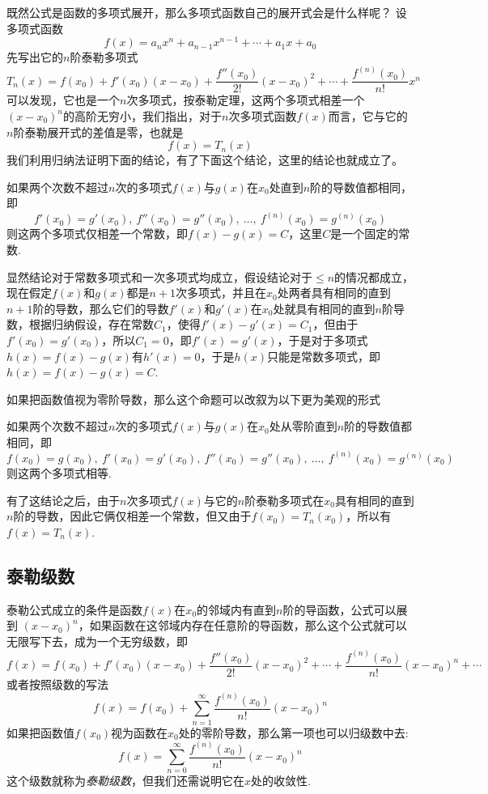 \begin{example}
  既然公式是函数的多项式展开，那么多项式函数自己的展开式会是什么样呢？ 设多项式函数
  \[ f(x) = a_nx^n+a_{n-1}x^{n-1}+\cdots+a_1x+a_0 \]
  先写出它的$n$阶泰勒多项式
\[ T_n(x) = f(x_0) + f'(x_0)(x-x_0)+\frac{f''(x_0)}{2!}(x-x_0)^2+ \cdots +\frac{f^{(n)}(x_0)}{n!}x^n \]
可以发现，它也是一个$n$次多项式，按泰勒定理，这两个多项式相差一个$(x-x_0)^n$的高阶无穷小，我们指出，对于$n$次多项式函数$f(x)$而言，它与它的$n$阶泰勒展开式的差值是零，也就是
\[ f(x) = T_n(x) \]
我们利用归纳法证明下面的结论，有了下面这个结论，这里的结论也就成立了。

\begin{statement}
  如果两个次数不超过$n$次的多项式$f(x)$与$g(x)$在$x_0$处直到$n$阶的导数值都相同，即
  \[ f'(x_0) = g'(x_0), \  f''(x_0) = g''(x_0), \  \ldots, \  f^{(n)}(x_0) = g^{(n)}(x_0) \]
  则这两个多项式仅相差一个常数，即$f(x)-g(x)=C$，这里$C$是一个固定的常数.
\end{statement}

显然结论对于常数多项式和一次多项式均成立，假设结论对于$\leqslant n$的情况都成立，现在假定$f(x)$和$g(x)$都是$n+1$次多项式，并且在$x_0$处两者具有相同的直到$n+1$阶的导数，那么它们的导数$f'(x)$和$g'(x)$在$x_0$处就具有相同的直到$n$阶导数，根据归纳假设，存在常数$C_1$，使得$f'(x)-g'(x)=C_1$，但由于$f'(x_0)=g'(x_0)$，所以$C_1=0$，即$f'(x)=g'(x)$，于是对于多项式$h(x)=f(x)-g(x)$有$h'(x)=0$，于是$h(x)$只能是常数多项式，即$h(x)=f(x)-g(x)=C$.
\end{example}

如果把函数值视为零阶导数，那么这个命题可以改叙为以下更为美观的形式
\begin{statement}
  如果两个次数不超过$n$次的多项式$f(x)$与$g(x)$在$x_0$处从零阶直到$n$阶的导数值都相同，即
  \[ f(x_0)=g(x_0), \  f'(x_0) = g'(x_0), \  f''(x_0) = g''(x_0), \  \ldots, \  f^{(n)}(x_0) = g^{(n)}(x_0) \]
  则这两个多项式相等.
\end{statement}

有了这结论之后，由于$n$次多项式$f(x)$与它的$n$阶泰勒多项式在$x_0$具有相同的直到$n$阶的导数，因此它俩仅相差一个常数，但又由于$f(x_0)=T_n(x_0)$，所以有$f(x)=T_n(x)$.

\subsection{泰勒级数}
\label{sec:taylor-series}

泰勒公式成立的条件是函数$f(x)$在$x_0$的邻域内有直到$n$阶的导函数，公式可以展到 $(x-x_0)^n$，如果函数在这邻域内存在任意阶的导函数，那么这个公式就可以无限写下去，成为一个无穷级数，即
\[ f(x) = f(x_0) + f'(x_0)(x-x_0)+\frac{f''(x_0)}{2!}(x-x_0)^2+\cdots+\frac{f^{(n)}(x_0)}{n!}(x-x_0)^n+\cdots \]
或者按照级数的写法
\[ f(x) = f(x_0) + \sum_{n=1}^{\infty} \frac{f^{(n)}(x_0)}{n!}(x-x_0)^n \]
如果把函数值$f(x_0)$视为函数在$x_0$处的零阶导数，那么第一项也可以归级数中去:
\[ f(x) = \sum_{n=0}^{\infty} \frac{f^{(n)}(x_0)}{n!}(x-x_0)^n \]
这个级数就称为\emph{泰勒级数}，但我们还需说明它在$x$处的收敛性.


